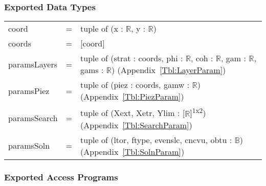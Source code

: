 \documentclass[12pt, titlepage]{article}
\begin{document}
\subsubsection{Exported Data Types}
\renewcommand*{\arraystretch}{1.5}
\begin{longtable}{p{} c p{}}
	coord &=& tuple of (x : $\mathbb{R}$, y : $\mathbb{R}$) \\
	coords &=& [coord] \\
	paramsLayers &=& tuple of (strat : coords, phi : $\mathbb{R}$, coh : 
	$\mathbb{R}$, gam : $\mathbb{R}$, gams : $\mathbb{R}$) 
	(Appendix~\ref{Tbl:LayerParam})\\
	paramsPiez &=& tuple of (piez : coords, gamw : $\mathbb{R}$) 
	(Appendix~\ref{Tbl:PiezParam}) \\
	paramsSearch &=& tuple of (Xext, Xetr, Ylim : 
	[$\mathbb{R}$]\textsuperscript{1x2}) (Appendix~\ref{Tbl:SearchParam}) \\
	paramsSoln &=& tuple of (ltor, ftype, evenslc, cncvu, obtu : 
	$\mathbb{B}$) (Appendix~\ref{Tbl:SolnParam}) \\
\end{longtable}

\subsubsection{Exported Access Programs}
\end{document}
